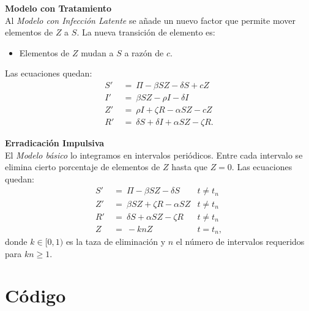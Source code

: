 \documentclass[11pt,spanish]{article}
\begin{document}
\textbf{Modelo con Tratamiento}\\
Al \textit{Modelo con Infección Latente} se añade un nuevo factor que permite mover elementos de $Z$ a $S$. La nueva transición de elemento es:
\begin{itemize}
\item Elementos de $Z$ mudan a $S$ a razón de $c$.
\end{itemize}
Las ecuaciones quedan:
\begin{align*}
S' \ & = \ \Pi - \beta S Z - \delta S + c Z \\
I' \ & = \ \beta S Z - \rho I - \delta I \\
Z' \ & = \ \rho I + \zeta R - \alpha S Z - c Z\\
R' \ & = \ \delta S + \delta I + \alpha S Z - \zeta R.
\end{align*}

\textbf{Erradicación Impulsiva}\\
El \textit{Modelo básico} lo integramos en intervalos periódicos. Entre cada intervalo se elimina cierto porcentaje de elementos de $Z$ hasta que $Z=0$. Las ecuaciones quedan: 
\begin{align*}
S' \ & = \ \Pi - \beta S Z - \delta S &t \neq t_n \\
Z' \ & = \ \beta S Z + \zeta R - \alpha S Z	& t \neq t_n \\
R' \ & = \ \delta S + \alpha S Z - \zeta R	& t \neq t_n  \\
Z  \ & = \ -k n Z  \	& t = t_n,  
\end{align*}
donde $ k \in [0,1)$ es la taza de eliminación y $n$ el número de intervalos requeridos para $ k n \geq 1$. 


\section*{Código}
\end{document}
